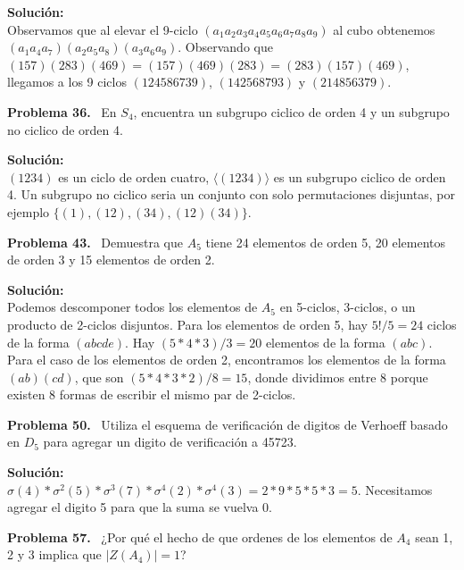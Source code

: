 \documentclass{article}
\newcounter{problem}
\newcounter{solution}
\newcommand\Problem[1]{%
  \stepcounter{problem}%
  \textbf{Problema #1.}~%
  \setcounter{solution}{0}%
}
\newcommand\TheSolution{%
  \textbf{Solución:}\\%
}
\begin{document}
\TheSolution{} Observamos que al elevar el 9-ciclo $(a_1 a_2 a_3 a_4 a_5 a_6
a_7 a_8 a_9)$ al cubo obtenemos $(a_1 a_4 a_7)(a_2 a_5 a_8)(a_3 a_6 a_9)$.
Observando que $(157)(283)(469) = (157)(469)(283) = (283)(157)(469)$, llegamos
a los 9 ciclos $(124586739)$, $(142568793)$ y $(214856379)$.

\Problem{36} En $S_4$, encuentra un subgrupo ciclico de orden 4 y un subgrupo
no ciclico de orden 4.

\TheSolution{} $(1234)$ es un ciclo de orden cuatro, $\langle(1234)\rangle$ es
un subgrupo ciclico de orden 4. Un subgrupo no ciclico seria un conjunto con
solo permutaciones disjuntas, por ejemplo $\{ (1), (12), (34), (12)(34)\}$.

\Problem{43} Demuestra que $A_5$ tiene 24 elementos de orden 5, 20 elementos
de orden 3 y 15 elementos de orden 2.

\TheSolution{} Podemos descomponer todos los elementos de $A_5$ en 5-ciclos,
3-ciclos, o un producto de 2-ciclos disjuntos. Para los elementos de orden 5,
hay $5! / 5 = 24$ ciclos de la forma $(abcde)$. Hay $(5 * 4 * 3) / 3 = 20$
elementos de la forma $(abc)$. Para el caso de los elementos de orden 2,
encontramos los elementos de la forma $(ab)(cd)$, que son $(5 * 4 * 3 * 2)/8
= 15$, donde dividimos entre 8 porque existen 8 formas de escribir el mismo
par de 2-ciclos.

\Problem{50} Utiliza el esquema de verificación de digitos de Verhoeff basado
en $D_5$ para agregar un digito de verificación a 45723.

\TheSolution{} $\sigma(4) * \sigma^{2}(5) * \sigma^{3}(7) * \sigma^{4}(2) *
\sigma^{4}(3) = 2 * 9 * 5 * 5 * 3 = 5$. Necesitamos agregar el digito 5 para
que la suma se vuelva 0.

\Problem{57} ¿Por qué el hecho de que ordenes de los elementos de $A_4$ sean
1, 2 y 3 implica que $|Z(A_4)| = 1$?
\end{document}
